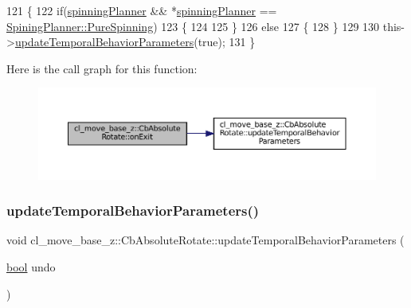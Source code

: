\begin{DoxyCode}
121 \{
122     \textcolor{keywordflow}{if}(\hyperlink{classcl__move__base__z_1_1CbAbsoluteRotate_a17d836524599af072cf2e3488e491a91}{spinningPlanner} && *\hyperlink{classcl__move__base__z_1_1CbAbsoluteRotate_a17d836524599af072cf2e3488e491a91}{spinningPlanner} == 
      \hyperlink{namespacecl__move__base__z_aab2ad3041275145f0065fb60b3299345aada5274435681a4ce04175bebfa6652f}{SpiningPlanner::PureSpinning})
123     \{
124 
125     \}
126     \textcolor{keywordflow}{else}
127     \{    
128     \}
129 
130     this->\hyperlink{classcl__move__base__z_1_1CbAbsoluteRotate_a2d8a4200dcacc00ad60c22ad2af5d4b2}{updateTemporalBehaviorParameters}(\textcolor{keyword}{true});
131 \}
\end{DoxyCode}
Here is the call graph for this function\+:
\nopagebreak
\begin{figure}[H]
\begin{center}
\leavevmode
\includegraphics[width=350pt]{classcl__move__base__z_1_1CbAbsoluteRotate_a0e362b8e9f0d7de5aeee183ba4031437_cgraph}
\end{center}
\end{figure}
\mbox{\label{classcl__move__base__z_1_1CbAbsoluteRotate_a2d8a4200dcacc00ad60c22ad2af5d4b2}} 
\subsubsection{\texorpdfstring{update\+Temporal\+Behavior\+Parameters()}{updateTemporalBehaviorParameters()}}
{\footnotesize\ttfamily void cl\+\_\+move\+\_\+base\+\_\+z\+::\+Cb\+Absolute\+Rotate\+::update\+Temporal\+Behavior\+Parameters (\begin{DoxyParamCaption}\item[{\hyperlink{classbool}{bool}}]{undo }\end{DoxyParamCaption})\hspace{0.3cm}{\ttfamily [private]}}



